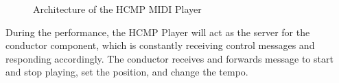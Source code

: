 \begin{figure}[H]
\caption{Architecture of the HCMP MIDI Player}
\label{fig:speciation}
\end{figure}

During the performance, the HCMP Player will act as 
the server for the conductor component, which is constantly 
receiving control messages and responding accordingly. The
conductor receives and forwards message to start and stop playing,
set the position, and change the tempo.












